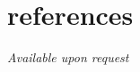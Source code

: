 \documentclass[paper=a4,fontsize=11pt]{scrartcl} %
\newlength{\spacebox}
\newcommand{\NewPart}[1]{\section*{\lowercase{#1}}}
\newcommand{\PersonalEntry}[2]{
        \noindent\hangindent=2em\hangafter=0 %
        \parbox{\spacebox}{        %
        \textit{#1}}               %
        \hspace{2em}{\color{dark-grey}\footnotesize #2 }\par %
}
\newcommand{\SkillsEntry}[2]{      %
        \noindent\hangindent=2em\hangafter=0 %
        \parbox{\spacebox}{        %
        \textit{#1}}               %
        \parbox[t][2.5em]{12.5cm}{%
          \noindent\hangindent=30px\hangafter=0{%
          \footnotesize #2}}%
        \normalsize \par}
\begin{document}
%

    


\NewPart{References}{}
\hspace{0.6cm} \textit{Available upon request}

\end{document}
